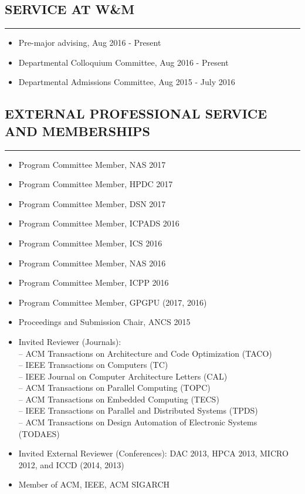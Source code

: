 \documentclass[10pt,a4]{article}
\begin{document}
\subsection*{SERVICE AT W\&M}
\hrule
\vspace{0.2cm}
\begin{itemize}
	\item Pre-major advising, Aug 2016 - Present
	\item Departmental Colloquium Committee, Aug 2016 - Present
	\item Departmental Admissions Committee, Aug 2015 - July 2016
\end{itemize}

\subsection*{EXTERNAL PROFESSIONAL SERVICE AND MEMBERSHIPS}
\hrule
\vspace{0.2cm}
\begin{itemize}
	\item Program Committee Member, NAS 2017
	\item Program Committee Member, HPDC 2017
	\item Program Committee Member, DSN 2017
	\item Program Committee Member, ICPADS 2016 
	\item Program Committee Member, ICS 2016
	\item Program Committee Member, NAS 2016
	\item Program Committee Member, ICPP 2016
	\item Program Committee Member, GPGPU (2017, 2016)
	\item Proceedings and Submission Chair, ANCS 2015
	\item Invited Reviewer (Journals):  \\
	-- ACM Transactions on Architecture and Code Optimization (TACO) \\
	-- IEEE Transactions on Computers (TC) \\ 
	-- IEEE Journal on Computer Architecture Letters (CAL) \\
	-- ACM Transactions on Parallel Computing (TOPC) \\
	-- ACM Transactions on Embedded Computing (TECS) \\
	-- IEEE Transactions on Parallel and Distributed Systems (TPDS) \\
	-- ACM Transactions on Design Automation of Electronic Systems (TODAES) \\
	\item Invited External Reviewer (Conferences):
	DAC 2013, HPCA 2013, MICRO 2012, and ICCD (2014, 2013)
	\item Member of ACM, IEEE, ACM SIGARCH
\end{itemize}
\end{document}
